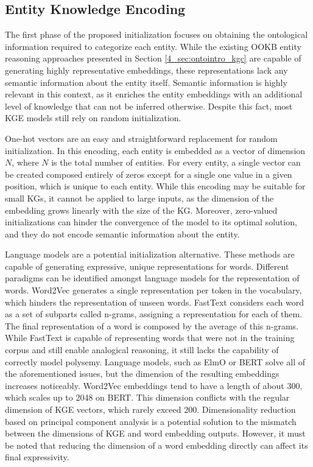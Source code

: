 \subsection{Entity Knowledge Encoding}\label{subsec:s4_entity_encode}
The first phase of the proposed initialization focuses on obtaining the ontological information required to categorize each entity. While the existing OOKB entity reasoning approaches presented in Section \ref{4_sec:ontointro_kgc} are capable of generating highly representative embeddings, these representations lack any semantic information about the entity itself. Semantic information is highly relevant in this context, as it enriches the entity embeddings with an additional level of knowledge that can not be inferred otherwise. Despite this fact, most KGE models still rely on random initialization. 

One-hot vectors are an easy and straightforward replacement for random initialization. In this encoding, each entity is embedded as a vector of dimension $N$, where $N$ is the total number of entities. For every entity, a single vector can be created composed entirely of zeros except for a single one value in a given position, which is unique to each entity. While this encoding may be suitable for small KGs, it cannot be applied to large inputs, as the dimension of the embedding grows linearly with the size of the KG. Moreover, zero-valued initializations can hinder the convergence of the model to its optimal solution, and they do not encode semantic information about the entity.

Language models are a potential initialization alternative. These methods are capable of generating expressive, unique representations for words. Different paradigms can be identified amongst language models for the representation of words. Word2Vec \citep{word2vec} generates a single representation per token in the vocabulary, which hinders the representation of unseen words. FastText \citep{fasttext1,fasttext2} considers each word as a set of subparts called n-grams, assigning a representation for each of them. The final representation of a word is composed by the average of this n-grams. While FastText is capable of representing words that were not in the training corpus and still enable analogical reasoning, it still lacks the capability of correctly model polysemy. Language models, such as ElmO \citep{elmo} or BERT \citep{bert} solve all of the aforementioned issues, but the dimension of the resulting embeddings increases noticeably. Word2Vec embeddings tend to have a length of about 300, which scales up to 2048 on BERT. This dimension conflicts with the regular dimension of KGE vectors, which rarely exceed 200. Dimensionality reduction based on principal component analysis is a potential solution to the mismatch between the dimensions of KGE and word embedding outputs. However, it must be noted that reducing the dimension of a word embedding directly can affect its final expressivity. 

